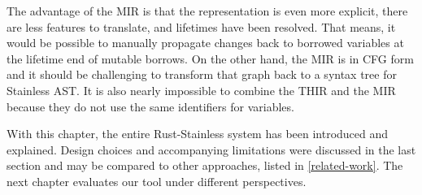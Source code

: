 The advantage of the MIR is that the representation is even more explicit, there
are less features to translate, and lifetimes have been resolved. That means, it
would be possible to manually propagate changes back to borrowed variables at
the lifetime end of mutable borrows. On the other hand, the MIR is in CFG form
and it should be challenging to transform that graph back to a syntax tree for
Stainless AST. It is also nearly impossible to combine the THIR and the MIR
because they do not use the same identifiers for variables.

\hfill \break \noindent With this chapter, the entire Rust-Stainless system has
been introduced and explained. Design choices and accompanying limitations were
discussed in the last section and may be compared to other approaches, listed in
\autoref{related-work}. The next chapter evaluates our tool under different
perspectives.

